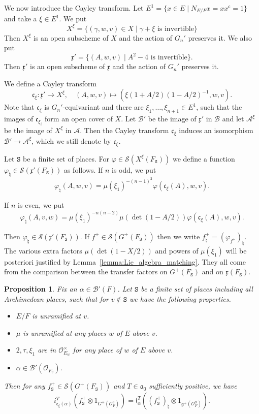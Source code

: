 \documentclass[letterpaper,11pt]{amsart}
\newcommand{\fa}{\mathfrak{a}}
\newcommand{\fc}{\mathfrak{c}}
\newcommand{\fg}{\mathfrak{g}}
\newcommand{\fx}{\mathfrak{x}}
\newcommand{\cA}{\mathcal{A}}
\newcommand{\cB}{\mathcal{B}}
\newcommand{\cO}{\mathcal{O}}
\newcommand{\cS}{\mathcal{S}}
\newcommand{\tS}{\mathtt{S}}
\newcommand{\<}{\negthickspace}
\theoremstyle{definition}
\theoremstyle{plain}
\newtheorem{prop}[definition]{Proposition}
\theoremstyle{remark}
\numberwithin{equation}{section}
\begin{document}
We now introduce the Cayley transform. Let $E^1 = \{ x \in E \mid N_{E/F}x =
x x^{\mathsf{c}} = 1\}$ and take a $\xi \in E^1$. We put
    \[
    X^{\xi} = \{ (\gamma, w, v) \in X \mid \gamma + \xi \text{ is invertible} \}
    \]
Then $X^{\xi}$ is an open subscheme of $X$ and the action
of $G_n'$ preserves it. We also put
    \[
    \fx'
    = \{(A, w, v) \mid A^2 - 4 \text{ is invertible}\}.
    \]
Then $\fx'$ is an open subscheme of $\fx$ and the action of $G_n'$
preserves it.

We define a Cayley transform
    \[
    \fc_{\xi}: \fx' \to X^{\xi}, \quad
    (A, w, v) \mapsto \left( \xi(1 + A/2)(1-A/2)^{-1}, w, v \right).
    \]
Note that $\fc_\xi$ is $G_n'$-equivariant and there are $\xi_1, \hdots, \xi_{n+1} \in E^1$, such that the images
of $\fc_{\xi_i}$ form an open cover of $X$. Let $\cB'$ be the image of
$\fx'$ in $\cB$ and let $\cA^\xi$ be the image of $X^\xi$ in $\cA$. Then the Cayley transform $\fc_{\xi}$ induces an isomorphism $\cB' \to \cA^\xi$,
which we still denote by $\fc_{\xi}$.

Let $\tS$ be a finite set of places. For $\varphi \in \cS(X^{\xi}(F_{\tS}))$ we define a function $\varphi_{\natural} \in \cS(\fx'(F_{\tS}))$ as follows. If $n$ is
odd, we put
    \[
        \varphi_\natural(A, w, v) =  \mu(\xi_1)^{-(n-1)^2} \varphi(\fc_{\xi}(A), w, v).
    \]

If $n$ is even, we put
    \[
         \varphi_{\natural}(A, v, w) = \mu(\xi_1)^{-n(n-2)}\mu(\det(1-A/2))
     \varphi(\fc_{\xi}(A), w, v).
    \]

Then $\varphi_{\natural} \in \cS(\fx'(F_{\tS}))$. If $f^+ \in
\cS(G^+(F_{\tS}))$ then we write $f^+_{\natural} =
(\varphi_{f^+})_{\natural}$. The various extra factors $\mu(\det(1-X/2))$ and
powers of $\mu(\xi_1)$ will be posteriori justified by
Lemma~\ref{lemma:Lie_algebra_matching}. They all come from the comparison
between the transfer factors on $G^+(F_{\tS})$ and on $\fx(F_\tS)$.

\begin{prop} \label{prop:infitesimal_decent_gl}
Fix an $\alpha \in \cB'(F)$. Let $\tS$ be a finite set of places including all
Archimedean places, such that for $v \not \in \tS$ we have the following properties.
\begin{itemize}
    \item $E/F$ is unramified at $v$.

    \item $\mu$ is unramified at any places $w$ of $E$ above $v$.

    \item $2, \tau, \xi_1$ are in $\cO^\times_{E_w}$ for any place of $w$
        of $E$ above $v$.

    \item $\alpha \in \cB'(\cO_{F_v})$.
\end{itemize}
Then for any $f_\tS^+ \in \cS(G^{+}(F_\tS))$ and $T \in \fa_0$ sufficiently
positive, we have
    \[
    i_{\fc_{\xi}(\alpha)}^T\left(f^+_\tS \otimes 1_{G^+(\cO_F^\tS)}\right) =
    \mathfrak{i}_\alpha^T\left((f_{\tS}^+)_\natural
    \otimes 1_{\fg^+(\cO_F^\tS)} \right).
    \]
\end{prop}
\end{document}
